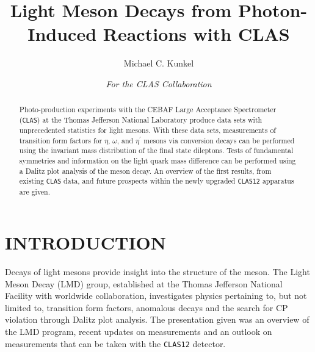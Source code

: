 \documentclass{aip-cp}
\begin{document}
\title{Light Meson Decays from Photon-Induced Reactions with CLAS}

\author[aff1]{Michael C. Kunkel}
\author{\textit{For the CLAS Collaboration}}
\maketitle

\begin{abstract}
Photo-production experiments with the CEBAF Large Acceptance Spectrometer (\textsc{\texttt{CLAS}}) at the Thomas Jefferson National Laboratory produce data sets with unprecedented statistics for light mesons. With these data sets, measurements of transition form factors for $\eta$, $\omega$, and $\eta^\prime$ mesons via conversion decays can be performed using the invariant mass distribution of the final state dileptons. Tests of fundamental symmetries and information on the light quark mass difference can be performed using a Dalitz plot analysis of the meson decay. An overview of the first results, from existing \textsc{\texttt{CLAS}} data, and future prospects within the newly upgraded \textsc{\texttt{CLAS12}} apparatus are given.
\end{abstract}

\section{INTRODUCTION}
Decays of light mesons provide insight into the structure of the meson. The Light Meson Decay (LMD) group, established at the Thomas Jefferson National Facility with worldwide collaboration, investigates physics pertaining to, but not limited to, transition form factors, anomalous decays and the search for CP violation through Dalitz plot analysis. The presentation given was an overview of the LMD program, recent updates on measurements and an outlook on measurements that can be taken with the \textsc{\texttt{CLAS12}} detector. 
\end{document}
